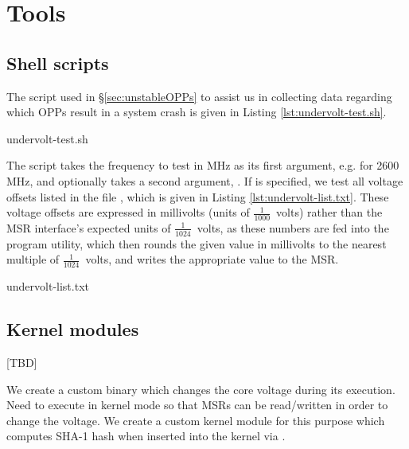 \section{Tools}
\label{sec:tools}

\subsection{Shell scripts}
\label{sec:undervolt-test.sh}

The script used in §\ref{sec:unstableOPPs} to assist us in collecting data
regarding which OPPs result in a system crash is given in Listing
\ref{lst:undervolt-test.sh}.


    {undervolt-test.sh}

The script takes the frequency to test in MHz as its first argument, e.g.
 for 2600 MHz, and optionally takes a second argument, .
If  is specified, we test all voltage offsets listed in the file
, which is given in Listing \ref{lst:undervolt-list.txt}.
These voltage offsets are expressed in millivolts (units of
$\frac{1}{1000}$~volts) rather than the MSR interface's expected units of
$\frac{1}{1024}$~volts, as these numbers are fed into the 
program utility, which then rounds the given value in millivolts to the nearest
multiple of $\frac{1}{1024}$~volts, and writes the appropriate value to the MSR.


    {undervolt-list.txt}

\subsection{Kernel modules}

[TBD]

We create a custom  binary which changes the core voltage during its
execution.
Need to execute in kernel mode so that MSRs can be read/written in order to
change the voltage.
We create a custom kernel module for this purpose which computes SHA-1 hash
when inserted into the kernel via .
